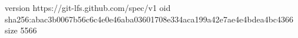 version https://git-lfs.github.com/spec/v1
oid sha256:abac3b0067b56c6c4e0e46aba03601708e334aca199a42e7ae4e4bdea4bc4366
size 5566
